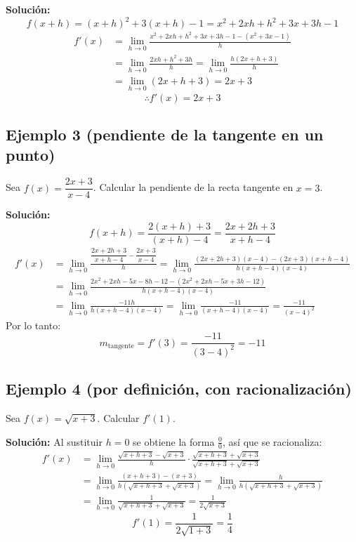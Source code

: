 \documentclass[12pt]{article}
\begin{document}
\textbf{Solución:}
\[
f(x+h) = (x+h)^2 + 3(x+h) - 1 = x^2 + 2xh + h^2 + 3x + 3h - 1
\]
\begin{align*}
f'(x) &= \lim_{h \to 0} \frac{x^2 + 2xh + h^2 + 3x + 3h - 1 - (x^2 + 3x - 1)}{h} \\
&= \lim_{h \to 0} \frac{2xh + h^2 + 3h}{h} = \lim_{h \to 0} \frac{h(2x + h + 3)}{h} \\
&= \lim_{h \to 0} (2x + h + 3) = 2x + 3
\end{align*}
\[
\therefore f'(x) = 2x + 3
\]

\subsection{Ejemplo 3 (pendiente de la tangente en un punto)}
Sea $f(x) = \dfrac{2x+3}{x-4}$. Calcular la pendiente de la recta tangente en $x = 3$.

\textbf{Solución:}
\[
f(x+h) = \frac{2(x+h) + 3}{(x+h) - 4} = \frac{2x + 2h + 3}{x + h - 4}
\]
\begin{align*}
f'(x) &= \lim_{h \to 0} \frac{\dfrac{2x + 2h + 3}{x + h - 4} - \dfrac{2x + 3}{x - 4}}{h}
= \lim_{h \to 0} \frac{(2x + 2h + 3)(x - 4) - (2x + 3)(x + h - 4)}{h(x + h - 4)(x - 4)} \\
&= \lim_{h \to 0} \frac{2x^2 + 2xh - 5x - 8h - 12 - (2x^2 + 2xh - 5x + 3h - 12)}{h(x + h - 4)(x - 4)} \\
&= \lim_{h \to 0} \frac{-11h}{h(x + h - 4)(x - 4)} = \lim_{h \to 0} \frac{-11}{(x + h - 4)(x - 4)} = \frac{-11}{(x - 4)^2}
\end{align*}
Por lo tanto:
\[
m_{\text{tangente}} = f'(3) = \frac{-11}{(3 - 4)^2} = -11
\]

\subsection{Ejemplo 4 (por definición, con racionalización)}
Sea $f(x) = \sqrt{x+3}$. Calcular $f'(1)$.

\textbf{Solución:} Al sustituir $h = 0$ se obtiene la forma $\frac{0}{0}$, así que se racionaliza:
\begin{align*}
f'(x) &= \lim_{h \to 0} \frac{\sqrt{x + h + 3} - \sqrt{x + 3}}{h} \cdot \frac{\sqrt{x + h + 3} + \sqrt{x + 3}}{\sqrt{x + h + 3} + \sqrt{x + 3}} \\
&= \lim_{h \to 0} \frac{(x + h + 3) - (x + 3)}{h\left(\sqrt{x + h + 3} + \sqrt{x + 3}\right)}
= \lim_{h \to 0} \frac{h}{h\left(\sqrt{x + h + 3} + \sqrt{x + 3}\right)} \\
&= \lim_{h \to 0} \frac{1}{\sqrt{x + h + 3} + \sqrt{x + 3}} = \frac{1}{2\sqrt{x + 3}}
\end{align*}
\[
f'(1) = \frac{1}{2\sqrt{1 + 3}} = \frac{1}{4}
\]
\end{document}
